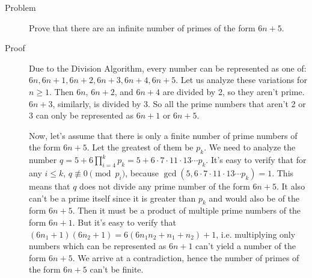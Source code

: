 \begin{description}
\item[Problem] Prove that there are an infinite number of primes of the form
$6n+5$.

\item[Proof] Due to the Division Algorithm, every number can be represented as
one of: $6n, 6n+1, 6n+2, 6n+3, 6n+4, 6n+5$. Let us analyze these variations for
$n \ge 1$. Then $6n$, $6n+2$, and $6n+4$ are divided by 2, so they aren't
prime. $6n + 3$, similarly, is divided by 3. So all the prime numbers that
aren't 2 or 3 can only be represented as $6n+1$ or $6n+5$.

Now, let's assume that there is only a finite number of prime numbers of the
form $6n+5$. Let the greatest of them be $p_k$. We need to analyze the number
$q = 5 + 6\prod_{i=4}^k p_k = 5 + 6 \cdot 7 \cdot 11 \cdot 13 \cdots p_k$. It's
easy to verify that for any $i \le k$, $q \not\equiv 0 \pmod p_i$, because
$\gcd(5, 6 \cdot 7 \cdot 11 \cdot 13 \cdots p_k) = 1$. This means that $q$ does
not divide any prime number of the form $6n + 5$. It also can't be a prime
itself since it is greater than $p_k$ and would also be of the form $6n + 5$.
Then it must be a product of multiple prime numbers of the form $6n + 1$. But
it's easy to verify that $(6 n_1 + 1) (6 n_2 + 1) = 6 (6 n_1 n_2 + n_1 + n_2) +
1$, i.e.  multiplying only numbers which can be represented as $6n+1$ can't
yield a number of the form $6n+5$. We arrive at a contradiction, hence the
number of primes of the form $6n+5$ can't be finite.

\end{description}
